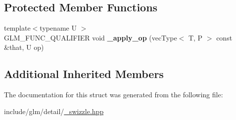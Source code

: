 \subsection*{Protected Member Functions}
\begin{DoxyCompactItemize}
\item 
\mbox{\label{structglm_1_1detail_1_1__swizzle__base2_a2ce452e18ec0b5f12befd12cb5619686}} 
{\footnotesize template$<$typename U $>$ }\\G\+L\+M\+\_\+\+F\+U\+N\+C\+\_\+\+Q\+U\+A\+L\+I\+F\+I\+ER void {\bfseries \+\_\+apply\+\_\+op} (vec\+Type$<$ T, P $>$ const \&that, U op)
\end{DoxyCompactItemize}
\subsection*{Additional Inherited Members}


The documentation for this struct was generated from the following file\+:\begin{DoxyCompactItemize}
\item 
include/glm/detail/\hyperlink{__swizzle_8hpp}{\+\_\+swizzle.\+hpp}\end{DoxyCompactItemize}
